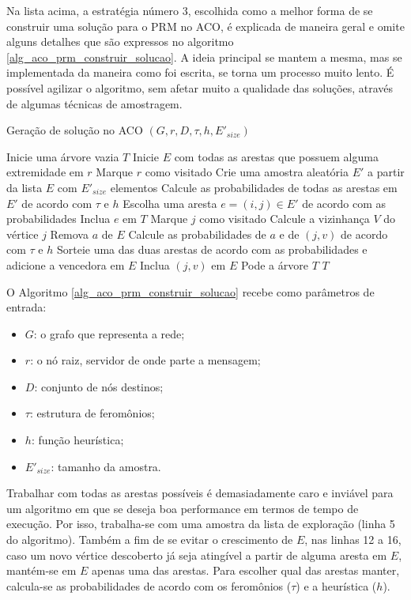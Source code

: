 Na lista acima, a estratégia número 3, escolhida como a melhor forma de se construir uma solução para o PRM no ACO, é explicada de maneira geral e omite alguns detalhes que são expressos no algoritmo \ref{alg_aco_prm_construir_solucao}. A ideia principal se mantem a mesma, mas se implementada da maneira como foi escrita, se torna um processo muito lento. É possível agilizar o algoritmo, sem afetar muito a qualidade das soluções, através de algumas técnicas de amostragem.

\begin{algorithm}
	\caption{Geração de solução no ACO $(G, r, D, \tau, h, E'_{size})$}
	\label{alg_aco_prm_construir_solucao}
	\begin{algorithmic}[1]
		\State Inicie uma árvore vazia $T$
		\State Inicie $E$ com todas as arestas que possuem alguma extremidade em $r$
		\State Marque $r$ como visitado
			\State Crie uma amostra aleatória $E'$ a partir da lista $E$ com $E'_{size}$ elementos
			\State Calcule as probabilidades de todas as arestas em $E'$ de acordo com $\tau$ e $h$
			\State Escolha uma aresta $e=(i,j) \in E'$ de acordo com as probabilidades
			\State Inclua $e$ em $T$
			\State Marque $j$ como visitado
			\State Calcule a vizinhança $V$ do vértice $j$
					\State Remova $a$ de $E$
					\State Calcule as probabilidades de $a$ e de $(j, v)$ de acordo com $\tau$ e $h$
					\State Sorteie uma das duas arestas de acordo com as probabilidades e adicione a vencedora em $E$
					\State Inclua $(j, v)$ em $E$
				\EndIf
			\EndFor
		\EndWhile
		\State Pode a árvore $T$
		\State \Return $T$
	\end{algorithmic}
\end{algorithm}

O Algoritmo \ref{alg_aco_prm_construir_solucao} recebe como parâmetros de entrada:

\begin{itemize}
	\item $G$: o grafo que representa a rede;
	\item $r$: o nó raiz, servidor de onde parte a mensagem;
	\item $D$: conjunto de nós destinos;
	\item $\tau$: estrutura de feromônios;
	\item $h$: função heurística;
	\item $E'_{size}$: tamanho da amostra.
\end{itemize}

Trabalhar com todas as arestas possíveis é demasiadamente caro e inviável para um algoritmo em que se deseja boa performance em termos de tempo de execução. Por isso, trabalha-se com uma amostra da lista de exploração (linha 5 do algoritmo). Também a fim de se evitar o crescimento de $E$, nas linhas 12 a 16, caso um novo vértice descoberto já seja atingível a partir de alguma aresta em $E$, mantém-se em $E$ apenas uma das arestas. Para escolher qual das arestas manter, calcula-se as probabilidades de acordo com os feromônios ($\tau$) e a heurística ($h$).
